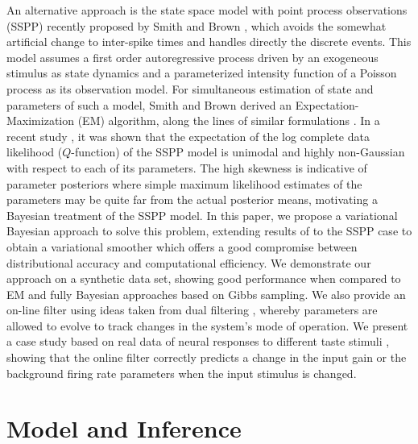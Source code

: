 \documentclass[12pt]{article}
\begin{document}
An alternative approach is the state space model with point process observations (SSPP) recently
proposed by Smith and Brown \cite{Smith_2003}, which avoids the somewhat artificial change to
inter-spike times and handles directly the discrete events. This model assumes a first order
autoregressive process driven by an exogeneous stimulus as state dynamics and a parameterized
intensity function of a Poisson process as its observation model. For simultaneous estimation of
state and parameters of such a model, Smith and Brown derived an Expectation-Maximization (EM)
algorithm, along the lines of similar formulations \cite{Roweis_1999}.  In a recent study
\cite{Yuan_2010}, it was shown that the expectation of the log complete data likelihood
($Q$-function) of the SSPP model is unimodal and highly non-Gaussian with respect to each of its
parameters. The high skewness is indicative of parameter posteriors where simple maximum likelihood
estimates of the parameters may be quite far from the actual posterior means, motivating a Bayesian
treatment of the SSPP model. In this paper, we propose a variational Bayesian approach to solve this
problem, extending results of \cite{Beal_2003b} to the SSPP case to obtain a variational smoother
which offers a good compromise between distributional accuracy and computational efficiency. We
demonstrate our approach on a synthetic data set, showing good performance when compared to EM and
fully Bayesian approaches based on Gibbs sampling. We also provide an on-line filter using ideas
taken from dual filtering \cite{Haykin_2001}, whereby parameters are allowed to evolve to track
changes in the system's mode of operation. We present a case study based on real data of neural
responses to different taste stimuli \cite{Lorenzo_2003}, showing that the online filter correctly
predicts a change in the input gain or the background firing rate parameters when the input stimulus
is changed.  \section{Model and Inference}
\end{document}
